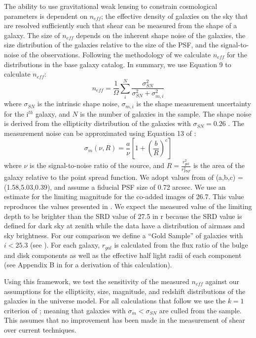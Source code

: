 \documentclass[11pt]{article}
\begin{document}
The ability to use gravitational weak lensing to constrain
cosmological parameters is dependent on $n_{eff}$; the effective
density of galaxies on the sky that are resolved sufficiently such that
shear can be measured from the shape of a galaxy. The size of
$n_{eff}$ depends on the inherent shape noise of the galaxies, the
size distribution of the galaxies relative to the size of the PSF, and
the signal-to-noise of the observations.  Following the methodology of
\citet{chang} we calculate $n_{eff}$ for the distributions in the base
galaxy catalog.  In summary, we use Equation 9 to calculate $n_{eff}$:
\begin{equation}
n_{eff} = \frac{1}{\Omega}\sum^N_i\frac{\sigma^2_{SN}}{\sigma^2_{SN}+\sigma^2_{m,i}}
\end{equation}
where $\sigma_{SN}$ is the intrinsic shape noise, $\sigma_{m,i}$ is
the shape measurement uncertainty for the i$^{th}$ galaxy, and $N$ is
the number of galaxies in the sample. The shape noise is derived from
the ellipticity distribution of the galaxies with $\sigma_{SN} = 0.26$
\citep{chang}.  The measurement noise can be approximated using
Equation 13 of \citet{chang}:
\begin{equation}
\sigma_m(\nu,R) = \frac{a}{\nu}\left[1+\left(\frac{b}{R}\right)^c\right]
\end{equation}
where $\nu$ is the signal-to-noise ratio of the source, and
$R=\frac{r_{gal}^2}{r_{PSF}^2}$ is the area of the galaxy relative to
the point spread function.  We adopt values from \citet{chang} of
(a,b,c) = (1.58,5.03,0.39), and assume a fiducial PSF size of 0.72
arcsec. We use an estimate for the limiting magnitude for the co-added
images of 26.7.  This value reproduces the values presented in
\citet{chang}.  We expect the measured value of the limiting depth to
be brighter than the SRD value of 27.5 in r because the SRD value is
defined for dark sky at zenith while the \citet{chang} data have a
distribution of airmass and sky brightness.  
For our comparison we define a ``Gold Sample'' of galaxies with $i <
25.3$ (see \citealt{LSSTScienceBook}).  For each galaxy, $r_{gal}$ is
calculated from the flux ratio of the bulge and disk components as
well as the effective half light radii of each component (see Appendix
B in \citet{chang} for a derivation of this calculation).

Using this framework, we test the sensitivity of the measured
$n_{eff}$ against our assumptions for the ellipticity, size,
magnitude, and redshift distributions of the galaxies in the universe
model.  For all calculations that follow we use the $k=1$ criterion of
\citet{chang}; meaning that galaxies with $\sigma_m < \sigma_{SN}$ are
culled from the sample. This assumes that no improvement has been made
in the measurement of shear over current techniques.  
\end{document}
